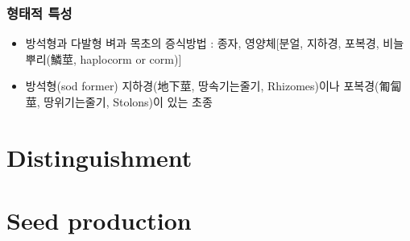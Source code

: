 \documentclass[]{book}
\providecommand{\tightlist}{%
  \setlength{\itemsep}{0pt}\setlength{\parskip}{0pt}}
\begin{document}
\subsection{형태적 특성}\label{-}

\begin{itemize}
\tightlist
\item
  방석형과 다발형 벼과 목초의 증식방법 : 종자, 영양체{[}분얼, 지하경,
  포복경, 비늘뿌리(鱗莖, haplocorm or corm){]}
\item
  방석형(sod former) 지하경(地下莖, 땅속기는줄기, Rhizomes)이나
  포복경(匍匐莖, 땅위기는줄기, Stolons)이 있는 초종
\end{itemize}

\chapter{Distinguishment}\label{distinguishment}

\chapter{Seed production}\label{seed-production}


\end{document}
